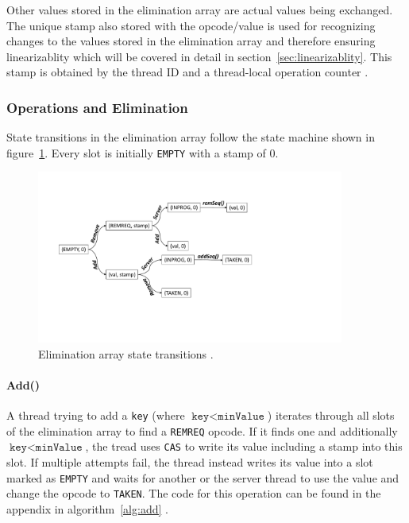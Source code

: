 Other values stored in the elimination array are actual values being exchanged. The unique stamp also stored with the opcode/value is used for recognizing changes to the values stored in the elimination array and therefore ensuring linearizablity which will be covered in detail in section~\ref{sec:linearizablity}. This stamp is obtained by the thread ID and a thread-local operation counter \cite{calciu_adaptive_2014}.

\subsubsection{Operations and Elimination}

State transitions in the elimination array follow the state machine shown in figure~\ref{fig:combining-state}. Every slot is initially \texttt{EMPTY} with a stamp of 0. 

\begin{figure}[htb]
	\centering
	\includegraphics[width=0.9\textwidth]{graphics/combining-state.pdf}
	\caption{Elimination array state transitions \cite{calciu_adaptive_2014}.}
	\label{fig:combining-state}
\end{figure}

\paragraph{Add()} A thread trying to add a \texttt{key} (where $\texttt{key} < \texttt{minValue}$) iterates through all slots of the elimination array to find a \texttt{REMREQ} opcode. If it finds one and additionally $\texttt{key} < \texttt{minValue}$, the tread uses \texttt{CAS} to write its value including a stamp into this slot. If multiple attempts fail, the thread instead writes its value into a slot marked as \texttt{EMPTY} and waits for another or the server thread to use the value and change the opcode to \texttt{TAKEN}. The code for this operation can be found in the appendix in algorithm~\ref{alg:add} \cite{calciu_adaptive_2014}.

